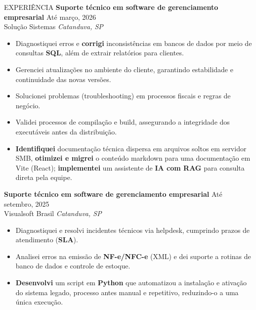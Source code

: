 \documentclass{resume} %
\begin{document}
\begin{rSection}{EXPERIÊNCIA}
\textbf{Suporte técnico em software de gerenciamento empresarial} \hfill Até março, 2026\\
Solução Sistemas \hfill \textit{Catanduva, SP}
 \begin{itemize}
    \itemsep -5pt {} 
    \item Diagnostiquei erros e \textbf{corrigi} inconsistências em bancos de dados por meio de consultas \textbf{SQL}, além de extrair relatórios para clientes.
    \item Gerenciei atualizações no ambiente do cliente, garantindo estabilidade e continuidade das novas versões.
    \item Solucionei problemas (troubleshooting) em processos fiscais e regras de negócio.
    \item Validei processos de compilação e build, assegurando a integridade dos executáveis antes da distribuição.
    \item \textbf{Identifiquei} documentação técnica dispersa em arquivos soltos em servidor SMB, \textbf{otimizei e migrei} o conteúdo markdown para uma documentação em Vite (React); \textbf{implementei} um assistente de \textbf{IA com RAG} para consulta direta pela equipe.
\end{itemize}
\textbf{Suporte técnico em software de gerenciamento empresarial} \hfill Até setembro, 2025\\
Visualsoft Brasil \hfill \textit{Catanduva, SP}
 \begin{itemize}
    \itemsep -5pt {} 
    \item Diagnostiquei e resolvi incidentes técnicos via helpdesk, cumprindo prazos de atendimento (\textbf{SLA}).
    \item Analisei erros na emissão de \textbf{NF-e/NFC-e} (XML) e dei suporte a rotinas de banco de dados e controle de estoque.
    \item \textbf{Desenvolvi} um script em \textbf{Python} que automatizou a instalação e ativação do sistema legado, processo antes manual e repetitivo, reduzindo-o a uma única execução.
 \end{itemize}
\end{rSection}
\end{document}
